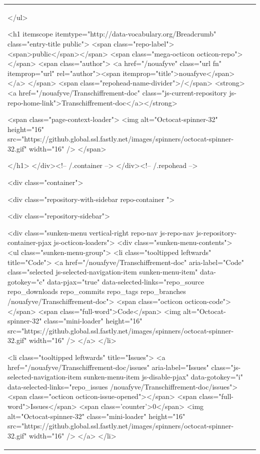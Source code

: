 \documentclass[a4paper,11pt,french]{article}
\begin{document}
\begin{tabular}{|m{8cm}|m{8cm}|}
</ul>

        <h1 itemscope itemtype="http://data-vocabulary.org/Breadcrumb" class="entry-title public">
          <span class="repo-label"><span>public</span></span>
          <span class="mega-octicon octicon-repo"></span>
          <span class="author">
            <a href="/nouafyve" class="url fn" itemprop="url" rel="author"><span itemprop="title">nouafyve</span></a>
          </span>
          <span class="repohead-name-divider">/</span>
          <strong><a href="/nouafyve/Transchiffrement-doc" class="js-current-repository js-repo-home-link">Transchiffrement-doc</a></strong>

          <span class="page-context-loader">
            <img alt="Octocat-spinner-32" height="16" src="https://github.global.ssl.fastly.net/images/spinners/octocat-spinner-32.gif" width="16" />
          </span>

        </h1>
      </div><!-- /.container -->
    </div><!-- /.repohead -->

    <div class="container">
      

      <div class="repository-with-sidebar repo-container  ">

        <div class="repository-sidebar">
            

<div class="sunken-menu vertical-right repo-nav js-repo-nav js-repository-container-pjax js-octicon-loaders">
  <div class="sunken-menu-contents">
    <ul class="sunken-menu-group">
      <li class="tooltipped leftwards" title="Code">
        <a href="/nouafyve/Transchiffrement-doc" aria-label="Code" class="selected js-selected-navigation-item sunken-menu-item" data-gotokey="c" data-pjax="true" data-selected-links="repo_source repo_downloads repo_commits repo_tags repo_branches /nouafyve/Transchiffrement-doc">
          <span class="octicon octicon-code"></span> <span class="full-word">Code</span>
          <img alt="Octocat-spinner-32" class="mini-loader" height="16" src="https://github.global.ssl.fastly.net/images/spinners/octocat-spinner-32.gif" width="16" />
</a>      </li>

        <li class="tooltipped leftwards" title="Issues">
          <a href="/nouafyve/Transchiffrement-doc/issues" aria-label="Issues" class="js-selected-navigation-item sunken-menu-item js-disable-pjax" data-gotokey="i" data-selected-links="repo_issues /nouafyve/Transchiffrement-doc/issues">
            <span class="octicon octicon-issue-opened"></span> <span class="full-word">Issues</span>
            <span class='counter'>0</span>
            <img alt="Octocat-spinner-32" class="mini-loader" height="16" src="https://github.global.ssl.fastly.net/images/spinners/octocat-spinner-32.gif" width="16" />
</a>        </li>


\end{tabular}
\end{document}

